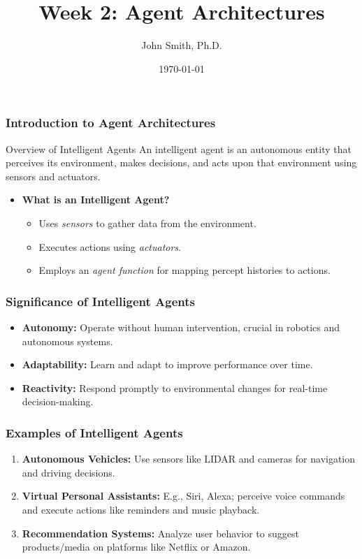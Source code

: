 \documentclass[aspectratio=169]{beamer}
\title[Week 2: Agent Architectures]{Week 2: Agent Architectures}
\author[J. Smith]{John Smith, Ph.D.}
\institute[University Name]{
  Department of Computer Science\\
  University Name\\
  \vspace{0.3cm}
  Email: email@university.edu\\
  Website: www.university.edu
}
\date{\today}
\begin{document}
\frame{\titlepage}

\begin{frame}[fragile]
    \frametitle{Introduction to Agent Architectures}
    \begin{block}{Overview of Intelligent Agents}
        An intelligent agent is an autonomous entity that perceives its environment, makes decisions, and acts upon that environment using sensors and actuators.
    \end{block}
    \begin{itemize}
        \item \textbf{What is an Intelligent Agent?}
            \begin{itemize}
                \item Uses \textit{sensors} to gather data from the environment.
                \item Executes actions using \textit{actuators}.
                \item Employs an \textit{agent function} for mapping percept histories to actions.
            \end{itemize}
    \end{itemize}
\end{frame}

\begin{frame}[fragile]
    \frametitle{Significance of Intelligent Agents}
    \begin{itemize}
        \item \textbf{Autonomy:} Operate without human intervention, crucial in robotics and autonomous systems.
        \item \textbf{Adaptability:} Learn and adapt to improve performance over time.
        \item \textbf{Reactivity:} Respond promptly to environmental changes for real-time decision-making.
    \end{itemize}
\end{frame}

\begin{frame}[fragile]
    \frametitle{Examples of Intelligent Agents}
    \begin{enumerate}
        \item \textbf{Autonomous Vehicles:} Use sensors like LIDAR and cameras for navigation and driving decisions.
        \item \textbf{Virtual Personal Assistants:} E.g., Siri, Alexa; perceive voice commands and execute actions like reminders and music playback.
        \item \textbf{Recommendation Systems:} Analyze user behavior to suggest products/media on platforms like Netflix or Amazon.
    \end{enumerate}
\end{frame}
\end{document}
